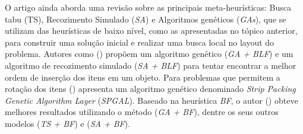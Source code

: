         O artigo ainda aborda uma revisão sobre as principais meta-heurísticas: Busca tabu (TS), Recozimento Simulado (\emph{SA}) e Algoritmos genéticos (\emph{GAs}), que se utilizam das heurísticas de baixo nível, como as apresentadas no tópico anterior, para construir uma solução inicial e realizar uma busca local no layout do problema. Autores como (\cite{SOKE2006}) propõem um algoritmo genético (\emph{GA + BLF}) e um algoritmo de recozimento simulado (\emph{SA + BLF}) para tentar encontrar a melhor ordem de inserção dos itens em um objeto. Para problemas que permitem a rotação dos itens (\cite{BORTFELDT2006}) apresenta um algoritmo genético denominado \emph{Strip Packing Genetic Algorithm Layer} (\emph{SPGAL}). Baseado na heurística \emph{BF}, o autor (\cite{burke2006metaheuristic}) obteve melhores resultados utilizando o método (\emph{GA + BF}), dentre os seus outros modelos (\emph{TS + BF}) e (\emph{SA + BF}).